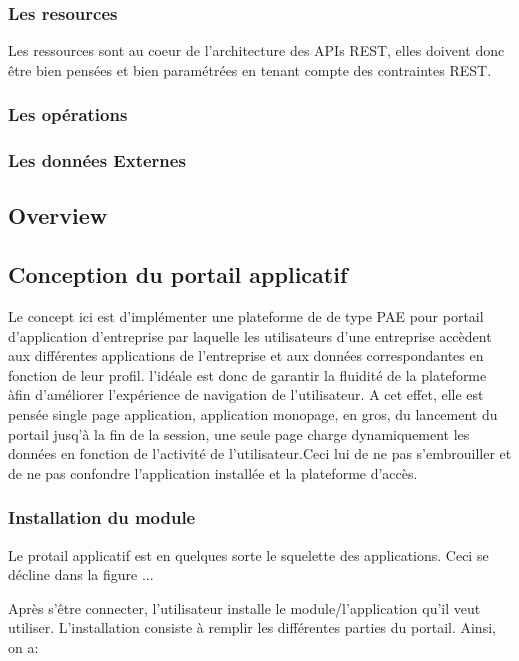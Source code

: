 \documentclass[a4paper,12pt]{article}
\begin{document}
\subsubsection{Les resources}
 Les ressources  sont au coeur de l'architecture des APIs REST, elles doivent donc être
 bien pensées et bien paramétrées en tenant compte des contraintes REST. 

\subsubsection{Les opérations}
\subsubsection{Les données Externes}%

\subsection{Overview}

\subsection{Conception du portail applicatif}%
 Le concept ici est
d'implémenter une plateforme de de type PAE pour portail d'application d'entreprise par laquelle
les utilisateurs d'une entreprise accèdent aux différentes
applications de l'entreprise et aux données correspondantes en
fonction de leur profil. l'idéale est donc de garantir la
fluidité de la plateforme àfin d'améliorer l'expérience de navigation de
l'utilisateur. A cet effet, elle est pensée single page application,
application monopage, en gros, du lancement du portail jusq'à la fin de la
session, une seule page charge dynamiquement les données en fonction
de l'activité de l'utilisateur.Ceci lui de ne pas
s'embrouiller et de ne pas confondre l'application installée et la
plateforme d'accès.  
   
\subsubsection{Installation du module}
Le protail applicatif est en quelques sorte le squelette des
applications. Ceci se décline dans la figure ...

Après s'être connecter, l'utilisateur installe le module/l'application 
qu'il veut utiliser. L'installation consiste à remplir les différentes
parties du portail. Ainsi, on a:
\end{document}
